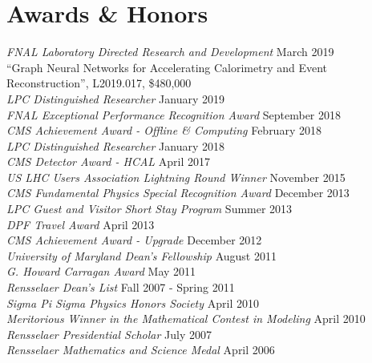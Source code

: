 \section{Awards \& Honors}
{\sl FNAL Laboratory Directed Research and Development} \hfill March 2019\\
``Graph Neural Networks for Accelerating Calorimetry and Event Reconstruction'', L2019.017, \$480,000\\
{\sl LPC Distinguished Researcher} \hfill January 2019\\
{\sl FNAL Exceptional Performance Recognition Award} \hfill September 2018\\
{\sl CMS Achievement Award - Offline \& Computing} \hfill February 2018\\
{\sl LPC Distinguished Researcher} \hfill January 2018\\
{\sl CMS Detector Award - HCAL } \hfill April 2017\\
{\sl US LHC Users Association Lightning Round Winner} \hfill November 2015\\
{\sl CMS Fundamental Physics Special Recognition Award} \hfill December 2013\\
\ifdefined\longflag
{\sl LPC Guest and Visitor Short Stay Program} \hfill Summer 2013\\
{\sl DPF Travel Award} \hfill April 2013\\
\fi
{\sl CMS Achievement Award - Upgrade} \hfill December 2012\\
{\sl University of Maryland Dean's Fellowship} \hfill August 2011\\
{\sl G. Howard Carragan Award} \hfill May 2011\\
{\sl Rensselaer Dean's List} \hfill Fall 2007 - Spring 2011\\
{\sl Sigma Pi Sigma Physics Honors Society} \hfill April 2010\\
{\sl Meritorious Winner in the Mathematical Contest in Modeling} \hfill April 2010%
{\sl Rensselaer Presidential Scholar} \hfill July 2007\\
{\sl Rensselaer Mathematics and Science Medal} \hfill April 2006%
